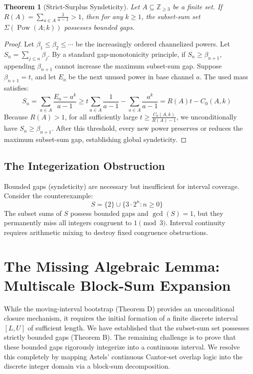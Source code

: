 \documentclass[12pt,reqno]{amsart}
\newtheorem{theorem}{Theorem}[section]
\theoremstyle{definition}
\begin{document}
\begin{theorem}[Strict-Surplus Syndeticity]
Let $A \subseteq \mathbb{Z}_{\ge 3}$ be a finite set. If $R(A) = \sum_{a \in A} \frac{1}{a-1} > 1$, then for any $k \ge 1$, the subset-sum set $\Sigma(\operatorname{Pow}(A; k))$ possesses bounded gaps.
\end{theorem}

\begin{proof}
Let $\beta_1 \le \beta_2 \le \cdots$ be the increasingly ordered channelized powers. Let $S_n = \sum_{j \le n} \beta_j$. By a standard gap-monotonicity principle, if $S_n \ge \beta_{n+1}$, appending $\beta_{n+1}$ cannot increase the maximum subset-sum gap. Suppose $\beta_{n+1} = t$, and let $E_a$ be the next unused power in base channel $a$. The used mass satisfies:
\[ S_n = \sum_{a \in A} \frac{E_a - a^k}{a-1} \ge t \sum_{a \in A} \frac{1}{a-1} - \sum_{a \in A} \frac{a^k}{a-1} = R(A)t - C_0(A,k) \]
Because $R(A) > 1$, for all sufficiently large $t \ge \frac{C_0(A,k)}{R(A)-1}$, we unconditionally have $S_n \ge \beta_{n+1}$. After this threshold, every new power preserves or reduces the maximum subset-sum gap, establishing global syndeticity.
\end{proof}

\subsection{The Integerization Obstruction}
Bounded gaps (syndeticity) are necessary but insufficient for interval coverage. Consider the counterexample:
\[ S = \{2\} \cup \{3 \cdot 2^n : n \ge 0\} \]
The subset sums of $S$ possess bounded gaps and $\gcd(S)=1$, but they permanently miss all integers congruent to $1 \pmod 3$. Interval continuity requires arithmetic mixing to destroy fixed congruence obstructions.
\section{The Missing Algebraic Lemma: Multiscale Block-Sum Expansion}

While the moving-interval bootstrap (Theorem D) provides an unconditional closure mechanism, it requires the initial formation of a finite discrete interval $[L, U]$ of sufficient length. We have established that the subset-sum set possesses strictly bounded gaps (Theorem B). The remaining challenge is to prove that these bounded gaps rigorously integerize into a continuous interval. We resolve this completely by mapping Astels' continuous Cantor-set overlap logic into the discrete integer domain via a block-sum decomposition.
\end{document}
